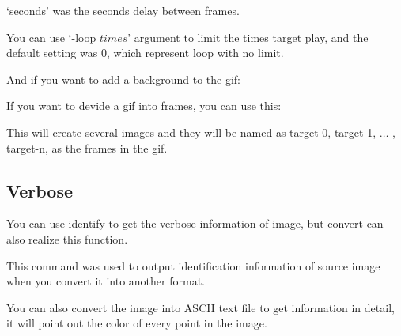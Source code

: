 \documentclass[12pt]{article}
\begin{document}
`seconds' was the seconds delay between frames.

You can use `-loop $times$' argument to limit the times target play, and the default setting was 0, which represent loop with no limit.

And if you want to add a background to the gif:\vspace{5mm}

{\centering{}\par} \vspace{5mm}

If you want to devide a gif into frames, you can use this:\vspace{5mm}

{\centering{}\par}\vspace{5mm}

This will create several images and they will be named as target-0, target-1, $\dots$ , target-n, as the frames in the gif.

\subsection{Verbose}

You can use identify to get the verbose information of image, but convert can also realize this function.\vspace{5mm}

{\centering{}\par}\vspace{5mm}

This command was used to output identification information of source image when you convert it into another format.

You can also convert the image into ASCII text file to get information in detail, it will point out the color of every point in the image.
\end{document}
